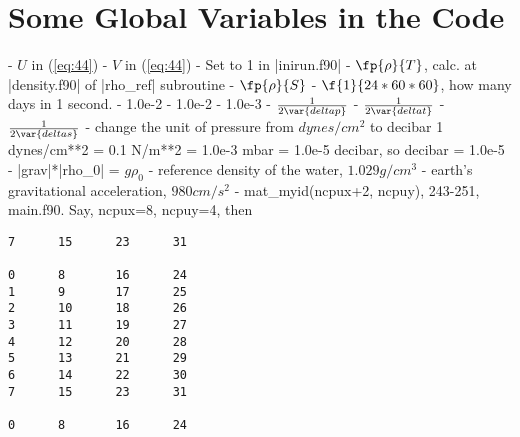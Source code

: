 
\section{Some Global Variables in the Code}

\bd
{} - $U$ in (\ref{eq:44})
 - $V$ in (\ref{eq:44})
 - Set to 1 in |inirun.f90|
 - $\fp{\rho}{T}$, calc. at |density.f90| of |rho_ref| subroutine
 - $\fp{\rho}{S}$
 - $\f{1}{24*60*60}$, how many days in 1 second.
 - 1.0e-2
 - 1.0e-2
 - 1.0e-3
 - $\frac{1}{2\var{deltap}}$
 - $\frac{1}{2\var{deltat}}$
 - $\frac{1}{2\var{deltas}}$
 - change the unit of pressure from $dynes/cm^2$ to decibar
1 dynes/cm**2 = 0.1 N/m**2 = 1.0e-3 mbar = 1.0e-5 decibar, so decibar = 1.0e-5
 - |grav|*|rho_0| = $g \rho_0$
 - reference density of the water, $1.029 g/cm^3$
 - earth's gravitational acceleration, $980 cm/s^2$
 - mat\_myid(ncpux+2, ncpuy), 243-251, main.f90. Say, ncpux=8, ncpuy=4, then
\begin{verbatim}
7      15      23      31

0      8       16      24
1      9       17      25
2      10      18      26
3      11      19      27
4      12      20      28
5      13      21      29
6      14      22      30
7      15      23      31

0      8       16      24
\end{verbatim}

